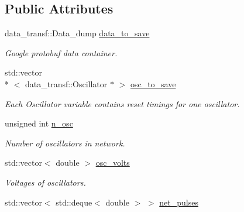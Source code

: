 \subsection*{Public Attributes}
\begin{DoxyCompactItemize}
\item 
\hypertarget{classLifNetSim_a05c9e5c69660c8d80423b2a843e2f869}{data\-\_\-transf\-::\-Data\-\_\-dump \hyperlink{classLifNetSim_a05c9e5c69660c8d80423b2a843e2f869}{data\-\_\-to\-\_\-save}}\label{classLifNetSim_a05c9e5c69660c8d80423b2a843e2f869}

\begin{DoxyCompactList}\small\item\em Google protobuf data container. \end{DoxyCompactList}\item 
\hypertarget{classLifNetSim_ad80cd17aede68f6b2aeecf69081b896e}{std\-::vector\\*
$<$ data\-\_\-transf\-::\-Oscillator $\ast$ $>$ \hyperlink{classLifNetSim_ad80cd17aede68f6b2aeecf69081b896e}{osc\-\_\-to\-\_\-save}}\label{classLifNetSim_ad80cd17aede68f6b2aeecf69081b896e}

\begin{DoxyCompactList}\small\item\em Each Oscillator variable contains reset timings for one oscillator. \end{DoxyCompactList}\item 
\hypertarget{classLifNetSim_a8e0213fdcfc7e39f0023ffeb3fd28972}{unsigned int \hyperlink{classLifNetSim_a8e0213fdcfc7e39f0023ffeb3fd28972}{n\-\_\-osc}}\label{classLifNetSim_a8e0213fdcfc7e39f0023ffeb3fd28972}

\begin{DoxyCompactList}\small\item\em Number of oscillators in network. \end{DoxyCompactList}\item 
\hypertarget{classLifNetSim_ae6b47993dd6f170acc7f82dab515f21a}{std\-::vector$<$ double $>$ \hyperlink{classLifNetSim_ae6b47993dd6f170acc7f82dab515f21a}{osc\-\_\-volts}}\label{classLifNetSim_ae6b47993dd6f170acc7f82dab515f21a}

\begin{DoxyCompactList}\small\item\em Voltages of oscillators. \end{DoxyCompactList}\item 
\hypertarget{classLifNetSim_a86d9cd7c257b717e29606801577153ec}{std\-::vector$<$ std\-::deque$<$ double $>$ $>$ \hyperlink{classLifNetSim_a86d9cd7c257b717e29606801577153ec}{net\-\_\-pulses}}\label{classLifNetSim_a86d9cd7c257b717e29606801577153ec}


\end{DoxyCompactItemize}
